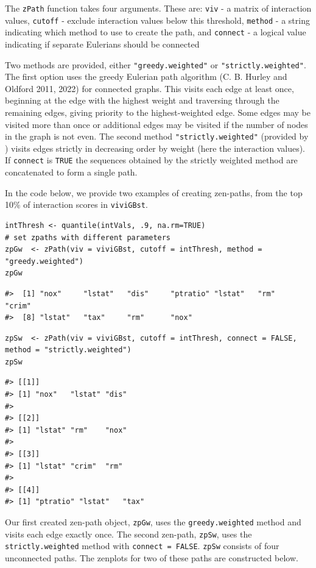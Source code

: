 The \texttt{zPath} function takes four arguments. These are:
\texttt{viv} - a matrix of interaction values,
\texttt{cutoff} - exclude interaction values below this threshold,
\texttt{method} - a string indicating which method to use to create the path, and
\texttt{connect} - a logical value indicating if separate Eulerians should be connected

Two methods are provided, either \texttt{"greedy.weighted"} or \texttt{"strictly.weighted"}. The first option uses the greedy Eulerian path algorithm (C. B. Hurley and Oldford 2011, 2022) for connected graphs. This visits each edge at least once, beginning at the edge with the highest weight and traversing through the remaining edges, giving priority to the highest-weighted edge. Some edges may be visited more than once or additional edges may be visited if the number of nodes in the graph is not even. The second method \texttt{"strictly.weighted"} (provided by ) visits edges strictly in decreasing order by weight (here the interaction values). If \texttt{connect} is \texttt{TRUE} the sequences obtained by the strictly weighted method are concatenated to form a single path.

In the code below, we provide two examples of creating zen-paths, from the top 10\% of interaction scores in \texttt{viviGBst}.

\begin{verbatim}
intThresh <- quantile(intVals, .9, na.rm=TRUE)
# set zpaths with different parameters
zpGw  <- zPath(viv = viviGBst, cutoff = intThresh, method = "greedy.weighted")
zpGw
\end{verbatim}

\begin{verbatim}
#>  [1] "nox"     "lstat"   "dis"     "ptratio" "lstat"   "rm"      "crim"   
#>  [8] "lstat"   "tax"     "rm"      "nox"
\end{verbatim}

\begin{verbatim}
zpSw  <- zPath(viv = viviGBst, cutoff = intThresh, connect = FALSE, method = "strictly.weighted")
zpSw
\end{verbatim}

\begin{verbatim}
#> [[1]]
#> [1] "nox"   "lstat" "dis"  
#> 
#> [[2]]
#> [1] "lstat" "rm"    "nox"  
#> 
#> [[3]]
#> [1] "lstat" "crim"  "rm"   
#> 
#> [[4]]
#> [1] "ptratio" "lstat"   "tax"
\end{verbatim}

Our first created zen-path object, \texttt{zpGw}, uses the \texttt{greedy.weighted} method and visits each edge exactly once. The second zen-path, \texttt{zpSw}, uses the \texttt{strictly.weighted} method with \texttt{connect\ =\ FALSE}.
\texttt{zpSw} consists of four unconnected paths.
The zenplots for two of these paths are constructed below.

